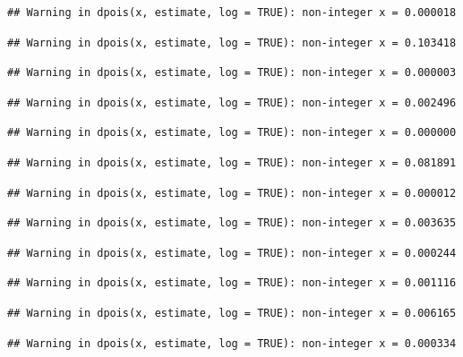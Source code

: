 \documentclass[]{article}
\begin{document}
\begin{verbatim}
## Warning in dpois(x, estimate, log = TRUE): non-integer x = 0.000018
\end{verbatim}

\begin{verbatim}
## Warning in dpois(x, estimate, log = TRUE): non-integer x = 0.103418
\end{verbatim}

\begin{verbatim}
## Warning in dpois(x, estimate, log = TRUE): non-integer x = 0.000003
\end{verbatim}

\begin{verbatim}
## Warning in dpois(x, estimate, log = TRUE): non-integer x = 0.002496
\end{verbatim}

\begin{verbatim}
## Warning in dpois(x, estimate, log = TRUE): non-integer x = 0.000000
\end{verbatim}

\begin{verbatim}
## Warning in dpois(x, estimate, log = TRUE): non-integer x = 0.081891
\end{verbatim}

\begin{verbatim}
## Warning in dpois(x, estimate, log = TRUE): non-integer x = 0.000012
\end{verbatim}

\begin{verbatim}
## Warning in dpois(x, estimate, log = TRUE): non-integer x = 0.003635
\end{verbatim}

\begin{verbatim}
## Warning in dpois(x, estimate, log = TRUE): non-integer x = 0.000244
\end{verbatim}

\begin{verbatim}
## Warning in dpois(x, estimate, log = TRUE): non-integer x = 0.001116
\end{verbatim}

\begin{verbatim}
## Warning in dpois(x, estimate, log = TRUE): non-integer x = 0.006165
\end{verbatim}

\begin{verbatim}
## Warning in dpois(x, estimate, log = TRUE): non-integer x = 0.000334
\end{verbatim}
\end{document}

